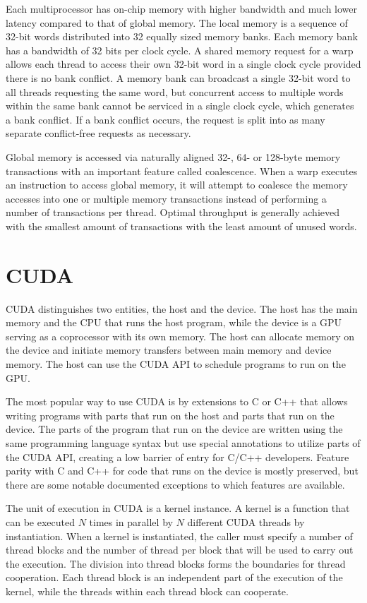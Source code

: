 Each multiprocessor has on-chip memory with higher bandwidth and much lower latency compared to that of global memory. The local memory is a sequence of 32-bit words distributed into 32 equally sized memory banks. Each memory bank has a bandwidth of 32 bits per clock cycle. A shared memory request for a warp allows each thread to access their own 32-bit word in a single clock cycle provided there is no bank conflict. A memory bank can broadcast a single 32-bit word to all threads requesting the same word, but concurrent access to multiple words within the same bank cannot be serviced in a single clock cycle, which generates a bank conflict. If a bank conflict occurs, the request is split into as many separate conflict-free requests as necessary.

Global memory is accessed via naturally aligned 32-, 64- or 128-byte memory transactions with an important feature called coalescence. When a warp executes an instruction to access global memory, it will attempt to coalesce the memory accesses into one or multiple memory transactions instead of performing a number of transactions per thread. Optimal throughput is generally achieved with the smallest amount of transactions with the least amount of unused words.

\section{CUDA}

CUDA distinguishes two entities, the host and the device. The host has the main memory and the CPU that runs the host program, while the device is a GPU serving as a coprocessor with its own memory. The host can allocate memory on the device and initiate memory transfers between main memory and device memory. The host can use the CUDA API to schedule programs to run on the GPU.\@

The most popular way to use CUDA is by extensions to C or C++ that allows writing programs with parts that run on the host and parts that run on the device. The parts of the program that run on the device are written using the same programming language syntax but use special annotations to utilize parts of the CUDA API, creating a low barrier of entry for C/C++ developers. Feature parity with C and C++ for code that runs on the device is mostly preserved, but there are some notable documented exceptions to which features are available.

The unit of execution in CUDA is a kernel instance. A kernel is a function that can be executed \(N\) times in parallel by \(N\) different CUDA threads by instantiation. When a kernel is instantiated, the caller must specify a number of thread blocks and the number of thread per block that will be used to carry out the execution. The division into thread blocks forms the boundaries for thread cooperation. Each thread block is an independent part of the execution of the kernel, while the threads within each thread block can cooperate.


